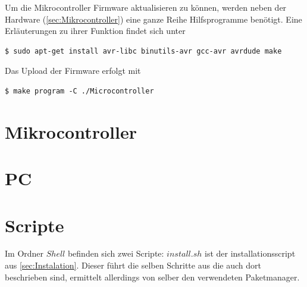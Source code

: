 \documentclass[12pt, a4paper, oneside]{report}
\begin{document}
Um die Mikrocontroller Firmware aktualisieren zu können, werden neben der Hardware (\autoref{sec:Mikrocontroller})  eine ganze Reihe Hilfsprogramme benötigt. Eine Erläuterungen zu ihrer Funktion findet sich unter \cite{UbuntuAVR}
\begin{lstlisting}
$ sudo apt-get install avr-libc binutils-avr gcc-avr avrdude make
\end{lstlisting}
Das Upload der Firmware erfolgt mit
\begin{lstlisting}
$ make program -C ./Microcontroller
\end{lstlisting}

\section{Mikrocontroller}
\section{PC}
\section{Scripte}
Im Ordner $Shell$ befinden sich zwei Scripte:
$install.sh$ ist der installationsscript aus \autoref{sec:Instalation}. 
Dieser führt die selben Schritte aus die auch dort beschrieben sind, 
ermittelt allerdings von selber den verwendeten Paketmanager.
\end{document}
